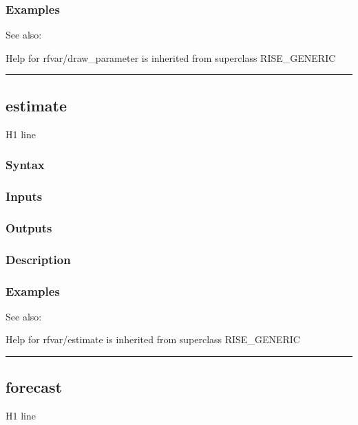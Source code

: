 \documentclass[letterpaper,10pt,english]{sphinxmanual}
\begin{document}
\subsubsection{Examples}
\label{classes/models/@rfvar/rfvar:id13}
See also:

Help for rfvar/draw\_parameter is inherited from superclass RISE\_GENERIC


\bigskip\hrule{}\bigskip



\subsection{estimate}
\label{classes/models/@rfvar/rfvar:estimate}\label{classes/models/@rfvar/rfvar:id14}
H1 line


\subsubsection{Syntax}
\label{classes/models/@rfvar/rfvar:id15}

\subsubsection{Inputs}
\label{classes/models/@rfvar/rfvar:id16}

\subsubsection{Outputs}
\label{classes/models/@rfvar/rfvar:id17}

\subsubsection{Description}
\label{classes/models/@rfvar/rfvar:id18}

\subsubsection{Examples}
\label{classes/models/@rfvar/rfvar:id19}
See also:

Help for rfvar/estimate is inherited from superclass RISE\_GENERIC


\bigskip\hrule{}\bigskip



\subsection{forecast}
\label{classes/models/@rfvar/rfvar:id20}\label{classes/models/@rfvar/rfvar:forecast}
H1 line
\end{document}
